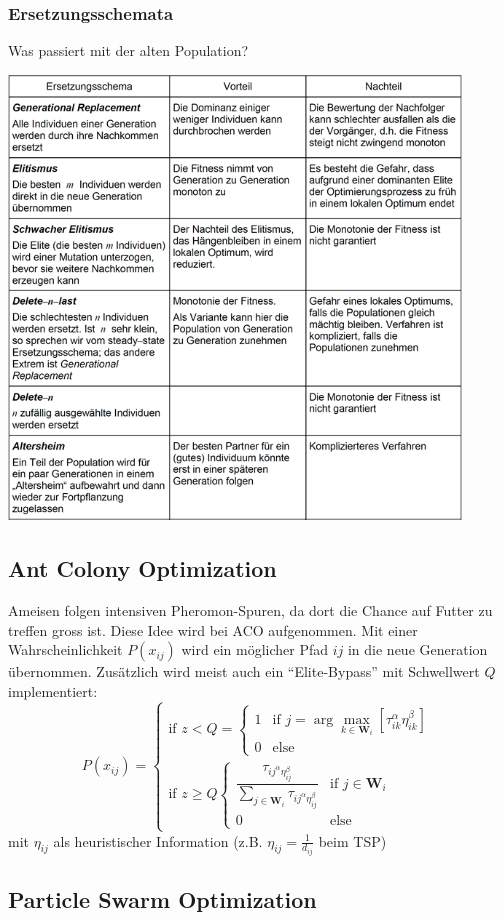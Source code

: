  \subsubsection{Ersetzungsschemata }
   Was passiert mit der alten Population? 
   
   \includegraphics[width=12cm]{./Content/MetaHeuristics/GeneticAlgorithms_Replacements}
   
   
 \subsection{Ant Colony Optimization }
   Ameisen folgen intensiven Pheromon-Spuren, da dort die Chance auf Futter zu treffen gross ist. Diese Idee wird bei ACO aufgenommen. Mit einer Wahrscheinlichkeit $P(x_{ij})$ wird ein möglicher Pfad $ij$ in die neue Generation übernommen. Zusätzlich wird meist auch ein "`Elite-Bypass"' mit Schwellwert $Q$ implementiert:
   $$P(x_{ij}) = 
   \begin{cases}
     \text{if } z < Q = 
     \begin{cases}
       1 & \text{if } j = \arg \max\limits_{k \in \mathbf{W}_i}[\tau_{ik}^\alpha \eta_{ik}^\beta] \\
       0 & \text{else}
     \end{cases} \\
     \text{if } z \geq Q
     \begin{cases}
       \dfrac{\tau_{ij^\alpha \eta_{ij}^\beta}}{\sum\limits_{j \in \mathbf{W}_i} \tau_{ij^\alpha \eta_{ij}^\beta}}  & \text{if }j \in \mathbf{W}_i\\
       0 & \text{else}
     \end{cases}
   \end{cases}$$
   mit $\eta_{ij}$ als heuristischer Information (z.B. $\eta_{ij} = \frac{1}{d_{ij}}$ beim TSP)
 
 
 \subsection{Particle Swarm Optimization }
 
 